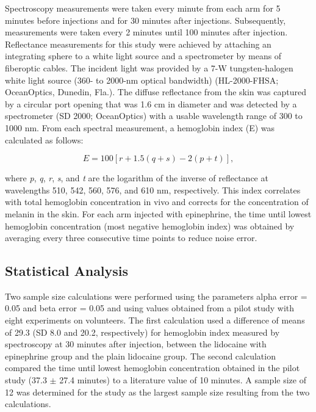 Spectroscopy measurements were taken every minute from each arm for 5 minutes before injections and for 30 minutes after injections. Subsequently, measurements were taken every 2 minutes until 100 minutes after injection. Reflectance measurements for this study were achieved by attaching an integrating sphere to a white light source and a spectrometer by means of fiberoptic cables. The incident light was provided by a 7-W tungsten-halogen white light source (360- to 2000-nm optical bandwidth) (HL-2000-FHSA; OceanOptics, Dunedin, Fla.). The diffuse reflectance from the skin was captured by a circular port opening that was 1.6 cm in diameter and was detected by a spectrometer (SD 2000; OceanOptics) with a usable wavelength range of 300 to 1000 nm. From each spectral measurement, a hemoglobin index (E) was calculated as follows\cite{Dawson1980}:

\begin{equation}
E = 100[r+1.5(q+s)-2(p+t)],
\end{equation}

where \emph{p}, \emph{q}, \emph{r}, \emph{s}, and \emph{t} are the logarithm of the inverse of reflectance at wavelengths 510, 542, 560, 576, and 610 nm, respectively. This index correlates with total hemoglobin concentration in vivo and corrects for the concentration of melanin in the skin. For each arm injected with epinephrine, the time until lowest hemoglobin concentration (most negative hemoglobin index) was obtained by averaging every three consecutive time points to reduce noise error.

\subsection{Statistical Analysis}
Two sample size calculations were performed using the parameters alpha error = 0.05 and beta error = 0.05 and using values obtained from a pilot study with eight experiments on volunteers. The first calculation used a difference of means of 29.3 (SD 8.0 and 20.2, respectively) for hemoglobin index measured by spectroscopy at 30 minutes after injection, between the lidocaine with epinephrine group and the plain lidocaine group. The second calculation compared the time until lowest hemoglobin concentration obtained in the pilot study (37.3 $\pm$ 27.4 minutes) to a literature value of 10 minutes. A sample size of 12 was determined for the study as the largest sample size resulting from the two calculations.

